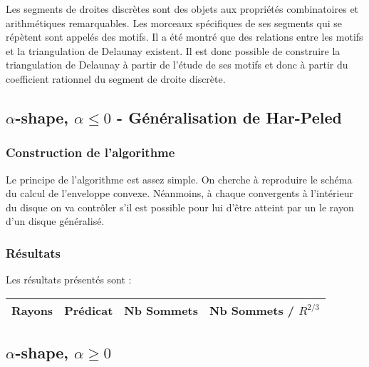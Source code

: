 Les segments de droites discrètes sont des objets aux propriétés combinatoires et arithmétiques remarquables. Les morceaux spécifiques de ses segments qui se répètent sont appelés des motifs. Il a été montré que des relations entre les motifs et la triangulation de Delaunay existent. Il est donc possible de construire la triangulation de Delaunay à partir de l'étude de ses motifs et donc à partir du coefficient rationnel du segment de droite discrète.




\subsection{$\alpha$-shape, $\alpha \leq 0$ - Généralisation de Har-Peled}

\subsubsection{Construction de l'algorithme}

Le principe de l’algorithme est assez simple. On cherche à reproduire le schéma du calcul de l’enveloppe convexe. Néanmoins, à chaque convergents à l'intérieur du disque on va contrôler s'il est possible pour lui d'être atteint par un le rayon d'un disque généralisé.

\subsubsection{Résultats}

Les résultats présentés sont : 

\begin{tabular}{|l|c||c|c|}
\hline
Rayons & Prédicat & Nb Sommets & Nb Sommets / $R^{2/3}$\\
\hline

\hline
\end{tabular} 



\subsection{$\alpha$-shape, $\alpha \geq 0$}

